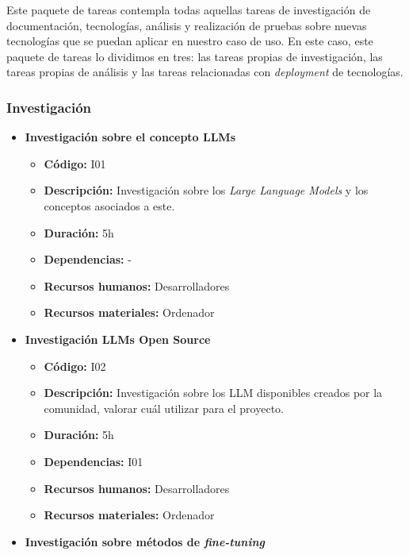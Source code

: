 
Este paquete de tareas contempla todas aquellas tareas de investigación de documentación,
tecnologías, análisis y realización de pruebas sobre nuevas tecnologías que se puedan
aplicar en nuestro caso de uso. En este caso, este paquete de tareas lo dividimos en tres:
las tareas propias de investigación, las tareas propias de análisis y las tareas relacionadas
con \textit{deployment} de tecnologías.

\subsubsection{Investigación}
\label{subsubsec:tareas_investigacion}


\begin{itemize}
    \item \textbf{Investigación sobre el concepto LLMs}
        \begin{itemize}
            \item \textbf{Código:} I01
            \item \textbf{Descripción:} Investigación sobre los \textit{Large Language Models} y los conceptos asociados a este.
            \item \textbf{Duración:} 5h
            \item \textbf{Dependencias:} -
            \item \textbf{Recursos humanos:} Desarrolladores
            \item \textbf{Recursos materiales:} Ordenador
        \end{itemize}
    \item \textbf{Investigación LLMs Open Source}
        \begin{itemize}
            \item \textbf{Código:} I02
            \item \textbf{Descripción:} Investigación sobre los LLM disponibles creados por la comunidad, valorar cuál utilizar para el proyecto.
            \item \textbf{Duración:} 5h
            \item \textbf{Dependencias:} I01
            \item \textbf{Recursos humanos:} Desarrolladores
            \item \textbf{Recursos materiales:} Ordenador
        \end{itemize}
    \item \textbf{Investigación sobre métodos de \textit{fine-tuning}}

\end{itemize}
